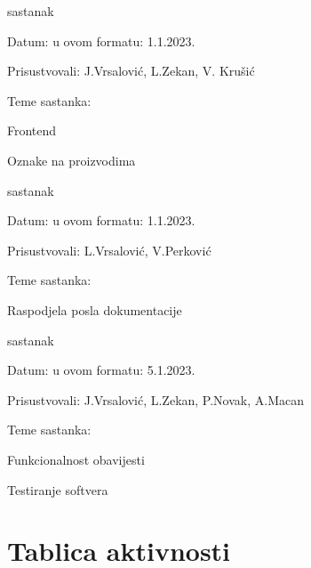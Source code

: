 \begin{packed_enum}
			\item  sastanak
			\item[] \begin{packed_item}
				\item Datum: u ovom formatu: 1.1.2023.
				\item Prisustvovali: J.Vrsalović, L.Zekan, V. Krušić
				\item Teme sastanka:
				\begin{packed_item}
					\item  Frontend
					\item  Oznake na proizvodima
				\end{packed_item}
			\end{packed_item}
			
			\item  sastanak
			\item[] \begin{packed_item}
				\item Datum: u ovom formatu: 1.1.2023.
				\item Prisustvovali: L.Vrsalović, V.Perković
				\item Teme sastanka:
				\begin{packed_item}
					\item  Raspodjela posla dokumentacije
				\end{packed_item}
			\end{packed_item}
			\item  sastanak
			\item[] \begin{packed_item}
				\item Datum: u ovom formatu: 5.1.2023.
				\item Prisustvovali: J.Vrsalović, L.Zekan, P.Novak, A.Macan
				\item Teme sastanka:
				\begin{packed_item}
					\item  Funkcionalnost obavijesti
					\item  Testiranje softvera
				\end{packed_item}
			\end{packed_item}
			
		\end{packed_enum}
		
		\eject
		\section*{Tablica aktivnosti}
		
